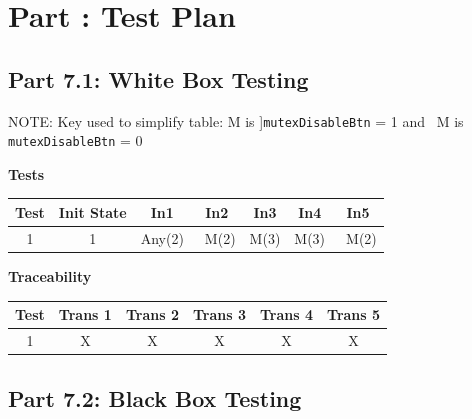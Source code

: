 \documentclass{article}
\newcounter{partNum}
\newcommand{\partNum}{%
        \stepcounter{partNum}%
        \thepartNum}
\newcommand{\sectPart}[1]{\section*{Part \partNum: #1}}
\begin{document}

\sectPart{Test Plan}

\subsection*{Part 7.1: White Box Testing}

NOTE: Key used to simplify table: M is ]\texttt{mutexDisableBtn} = 1 and ~M is \texttt{mutexDisableBtn} = 0

\vspace*{2em}

\begin{center}
    \textbf{Tests}\\
    \vspace{0.5em}
    \begin{tabular}{| c | c | c | c | c | c | c |}
        \hline
        Test & Init State & In1 & In2 & In3 & In4 & In5 \\ \hline
        1 & 1 & Any(2) & ~M(2) & M(3) & M(3) & ~M(2) \\ \hline
    \end{tabular}
\end{center}

\vspace*{2em}

\begin{center}
    \textbf{Traceability} \\
    \vspace{0.5em}
    \begin{tabular}{| c | c | c | c | c | c |}
        \hline
        Test & Trans 1 & Trans 2 & Trans 3 & Trans 4 & Trans 5 \\ \hline
        1 & X & X & X & X & X \\ \hline
    \end{tabular}
\end{center}

\newpage

\subsection*{Part 7.2: Black Box Testing}
\end{document}
